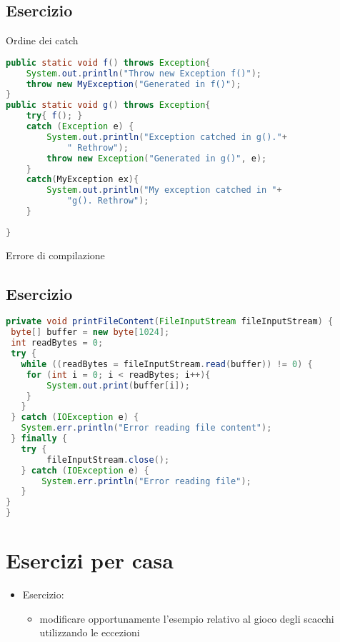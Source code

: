\documentclass{article}
\begin{document}
\subsection{Esercizio}
Ordine dei catch
\begin{lstlisting}[language=Java]
public static void f() throws Exception{
    System.out.println("Throw new Exception f()");
    throw new MyException("Generated in f()");
}
public static void g() throws Exception{
    try{ f(); }
    catch (Exception e) {
        System.out.println("Exception catched in g()."+
            " Rethrow");
        throw new Exception("Generated in g()", e);
    }
    catch(MyException ex){
        System.out.println("My exception catched in "+
            "g(). Rethrow");
    }
    
}
\end{lstlisting}
Errore di compilazione

\subsection{Esercizio}

\begin{lstlisting}[language=Java]
private void printFileContent(FileInputStream fileInputStream) {
 byte[] buffer = new byte[1024];
 int readBytes = 0;
 try {
   while ((readBytes = fileInputStream.read(buffer)) != 0) {
    for (int i = 0; i < readBytes; i++){
        System.out.print(buffer[i]);
    }
   }
 } catch (IOException e) {
   System.err.println("Error reading file content");
 } finally {
   try {
        fileInputStream.close();
   } catch (IOException e) {
       System.err.println("Error reading file");
   }
} 
}
\end{lstlisting}

\section{Esercizi per casa}
\begin{itemize}
\item Esercizio:
\begin{itemize}
\item modificare opportunamente l'esempio relativo al gioco degli scacchi utilizzando le eccezioni
\end{itemize} 
\end{itemize}

\clearpage







\nocite{*}
\end{document}
